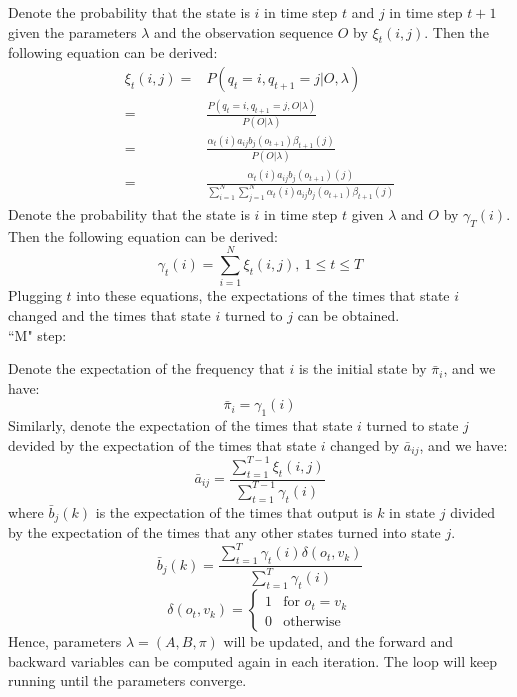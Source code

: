 \documentclass[conference]{IEEEtran}
\begin{document}
Denote the probability that the state is $i$ in time step $t$ and $j$ in time step $t+1$ given the parameters $\lambda$ and the observation sequence $O$ by $\xi_t(i,j)$. Then the following equation can be derived:
\begin{equation}
\begin{array}{rl}
\xi_t(i,j)=&P(q_t=i,q_{t+1}=j|O,\lambda)\\
=&\frac{P(q_t=i,q_{t+1}=j,O|\lambda)}{P(O|\lambda)}\\
=&\frac{\alpha_t(i)a_{ij}b_j(o_{t+1})\beta_{t+1}(j)}{P(O|\lambda)}\\
=&\frac{\alpha_t(i)a_{ij}b_j(o_{t+1})(j)}{\sum_{i=1}^N\sum_{j=1}^N\alpha_t(i)a_{ij}b_j(o_{t+1})\beta_{t+1}(j)}
\end{array}
\end{equation}
Denote the probability that the state is $i$ in time step $t$ given $\lambda$ and $O$ by $\gamma_T(i)$. Then the following equation can be derived:
\begin{equation}
\gamma_t(i)=\sum_{i=1}^N\xi_t(i,j),\ 1\leq t\leq T
\end{equation}
Plugging $t$ into these equations, the expectations of the times that state $i$ changed and the times that state $i$ turned to $j$ can be obtained.\\

\noindent ``M" step:

Denote the expectation of the frequency that $i$ is the initial state by $\bar{\pi}_i$, and we have:
\begin{equation}
\bar{\pi}_i=\gamma_1(i)
\end{equation}
Similarly, denote the expectation of the times that state $i$ turned to state $j$ devided by the expectation of the times that state $i$ changed by $\bar{a}_{ij}$, and we have:
\begin{equation}
\bar{a}_{ij}=\frac{\sum_{t=1}^{T-1}\xi_t(i,j)}{\sum_{t=1}^{T-1}\gamma_t(i)}
\end{equation}
where $\bar{b}_j(k)$ is the expectation of the times that output is $k$ in state $j$ divided by the expectation of the times that any other states turned into state $j$.
\begin{equation}
\bar{b}_j(k)=\frac{\sum_{t=1}^T\gamma_t(i)\delta(o_t,v_k)}{\sum_{t=1}^T\gamma_t(i)}
\end{equation}
\begin{equation}
\delta(o_t,v_k)=\left \{ 
\begin{array}{ll}
1&\text{for }o_t=v_k\\
0&\text{otherwise}
\end{array}
\right.
\end{equation}
Hence, parameters $\lambda=(A,B,\pi)$ will be updated, and the forward and backward variables can be computed again in each iteration. The loop will keep running until the parameters converge.\\
\end{document}
